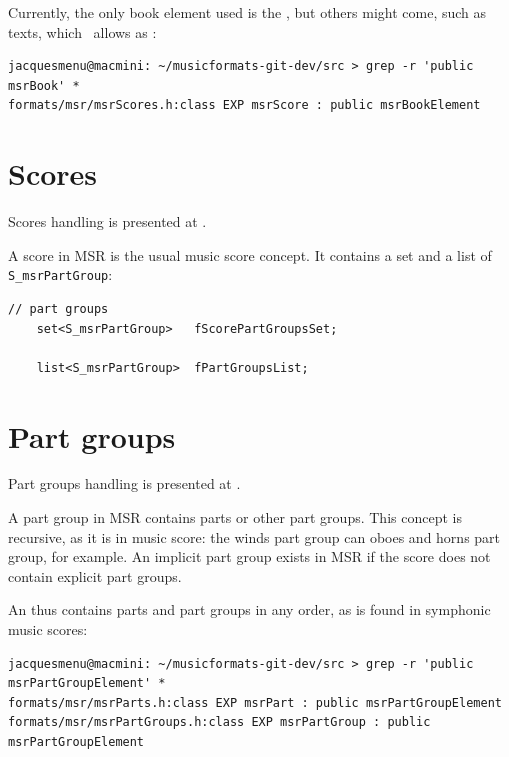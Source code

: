Currently, the only book element used is the , but others might come, such as texts, which \lily\ allows as :
\begin{lstlisting}[language=Terminal]
jacquesmenu@macmini: ~/musicformats-git-dev/src > grep -r 'public msrBook' *
formats/msr/msrScores.h:class EXP msrScore : public msrBookElement
\end{lstlisting}


\section{Scores}\label{Scores}

Scores handling is presented at .

A score in MSR is the usual music score concept. It contains a set and a list of {\tt S_msrPartGroup}:
\begin{lstlisting}[language=CPlusPlus]
    // part groups
    set<S_msrPartGroup>   fScorePartGroupsSet;

    list<S_msrPartGroup>  fPartGroupsList;
\end{lstlisting}


\section{Part groups}\label{Part groups}

Part groups handling is presented at .

A part group in MSR contains parts or other part groups. This concept is recursive, as it is in music score: the winds part group can oboes and horns part group, for example.
An implicit part group exists in MSR if the score does not contain explicit part groups.

An  thus contains parts and part groups in any order, as is found in symphonic music scores:
\begin{lstlisting}[language=Terminal]
jacquesmenu@macmini: ~/musicformats-git-dev/src > grep -r 'public msrPartGroupElement' *
formats/msr/msrParts.h:class EXP msrPart : public msrPartGroupElement
formats/msr/msrPartGroups.h:class EXP msrPartGroup : public msrPartGroupElement
\end{lstlisting}

